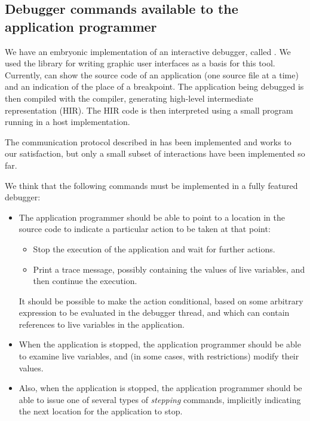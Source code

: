 \subsection{Debugger commands available to the application programmer}

We have an embryonic implementation of an interactive debugger, called
\clordane{}.  We used the \mcclim{} library for writing graphic user
interfaces as a basis for this tool.  Currently, \clordane{} can show
the source code of an application (one source file at a time) and an
indication of the place of a breakpoint.  The application being
debugged is then compiled with the \sicl{} compiler, generating
high-level intermediate representation (HIR).  The HIR code is then
interpreted using a small program running in a host \commonlisp{}
implementation.

The communication protocol described in
 has been implemented
and works to our satisfaction, but only a small subset of interactions
have been implemented so far.

We think that the following commands must be implemented in a fully
featured debugger:

\begin{itemize}
\item The application programmer should be able to point to a location
  in the source code to indicate a particular action to be taken at
  that point:
  \begin{itemize}
  \item Stop the execution of the application and wait for further
    actions.
  \item Print a trace message, possibly containing the values of live
    variables, and then continue the execution. 
  \end{itemize}
  It should be possible to make the action conditional, based on some
  arbitrary expression to be evaluated in the debugger thread, and
  which can contain references to live variables in the application.
\item When the application is stopped, the application programmer
  should be able to examine live variables, and (in some cases, with
  restrictions) modify their values.
\item Also, when the application is stopped, the application
  programmer should be able to issue one of several types of
  \emph{stepping} commands, implicitly indicating the next location
  for the application to stop.
\end{itemize}
